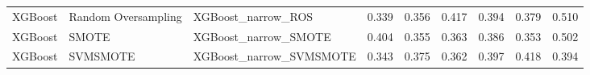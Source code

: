 \begin{tabular}{lllllllll}
                     XGBoost & Random Oversampling &                           XGBoost\_narrow\_ROS & 0.339 &                     0.356 &                 0.417 &                  0.394 &                                   0.379 &    0.510 \\
                     XGBoost &               SMOTE &                         XGBoost\_narrow\_SMOTE & 0.404 &                     0.355 &                 0.363 &                  0.386 &                                   0.353 &    0.502 \\
                     XGBoost &            SVMSMOTE &                      XGBoost\_narrow\_SVMSMOTE & 0.343 &                     0.375 &                 0.362 &                  0.397 &                                   0.418 &    0.394 \\
\bottomrule
\end{tabular}
